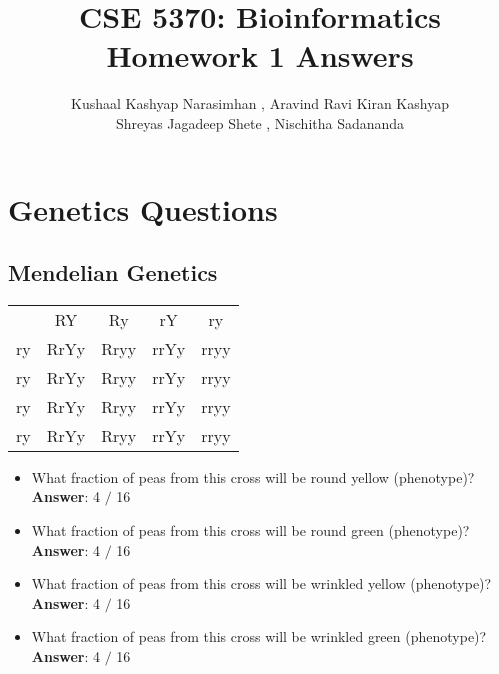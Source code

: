 \documentclass{article}
\title{CSE 5370: Bioinformatics \\ Homework 1 Answers}
\author{Kushaal Kashyap Narasimhan , Aravind Ravi Kiran Kashyap\\  Shreyas Jagadeep Shete , Nischitha Sadananda}
\begin{document}
\maketitle
\def\mca#1{\multicolumn{1}{c}{#1}}
\def\mcb#1{\multicolumn{1}{c|}{#1}}
\renewcommand{\arraystretch}{2.25}
\section{Genetics Questions}
\subsection{Mendelian Genetics}
\begin{tabular}{c|c|c|c|c|}
  \mca{}  & \mca{RY} & \mca{Ry}& \mca{rY} &\mca{ry} \\\cline{2-5}
  \mcb{ry}   & RrYy  & Rryy   & rrYy  & rryy \\\cline{2-5}
  \mcb{ry}   & RrYy  & Rryy   & rrYy  & rryy   \\\cline{2-5}
  \mcb{ry}   & RrYy  & Rryy   & rrYy  & rryy  \\\cline{2-5}
  \mcb{ry}   & RrYy  & Rryy   & rrYy  & rryy   \\\cline{2-5}
\end{tabular}

\begin{itemize}
    
    \item What fraction of peas from this cross will be round yellow (phenotype)? 
	\textbf{Answer}: 4 $/$ 16
    \item What fraction of peas from this cross will be round green (phenotype)?
	\textbf{Answer}: 4 $/$  16
    \item What fraction of peas from this cross will be wrinkled yellow (phenotype)?
	\textbf{Answer}: 4 $/$  16
    \item What fraction of peas from this cross will be wrinkled green (phenotype)?
	\textbf{Answer}: 4 $/$ 16
\end{itemize}
\end{document}
